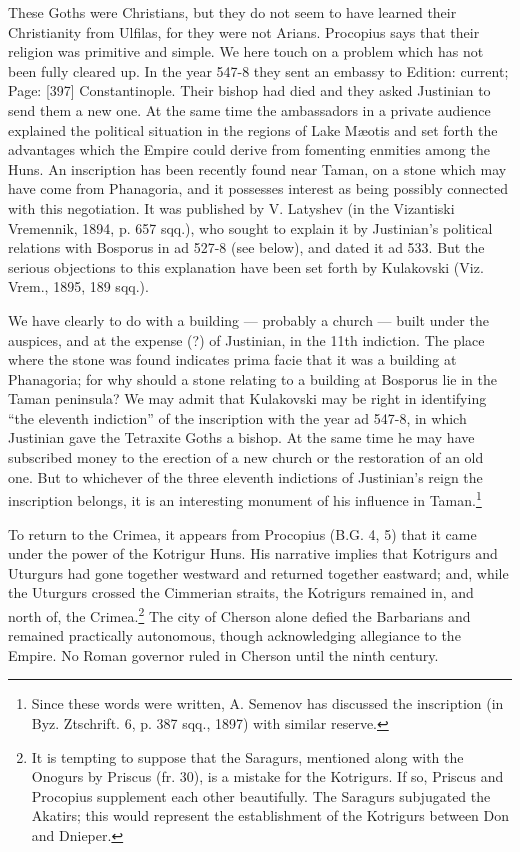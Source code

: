 These Goths were Christians, but they do not seem to have learned their Christianity from Ulfilas, for they were not Arians. Procopius says that their religion was primitive and simple. We here touch on a problem which has not been fully cleared up. In the year 547-8 they sent an embassy to Edition: current; Page: [397] Constantinople. Their bishop had died and they asked Justinian to send them a new one. At the same time the ambassadors in a private audience explained the political situation in the regions of Lake Mæotis and set forth the advantages which the Empire could derive from fomenting enmities among the Huns. An inscription has been recently found near Taman, on a stone which may have come from Phanagoria, and it possesses interest as being possibly connected with this negotiation. It was published by V. Latyshev (in the Vizantiski Vremennik, 1894, p. 657 sqq.), who sought to explain it by Justinian\texthebrew{}’s political relations with Bosporus in ad 527-8 (see below), and dated it ad 533. But the serious objections to this explanation have been set forth by Kulakovski (Viz. Vrem., 1895, 189 sqq.).

We have clearly to do with a building \texthebrew{—} probably a church \texthebrew{—} built under the auspices, and at the expense (?) of Justinian, in the 11th indiction. The place where the stone was found indicates prima facie that it was a building at Phanagoria; for why should a stone relating to a building at Bosporus lie in the Taman peninsula? We may admit that Kulakovski may be right in identifying \texthebrew{“}the eleventh indiction\texthebrew{}” of the inscription with the year ad 547-8, in which Justinian gave the Tetraxite Goths a bishop. At the same time he may have subscribed money to the erection of a new church or the restoration of an old one. But to whichever of the three eleventh indictions of Justinian\texthebrew{}’s reign the inscription belongs, it is an interesting monument of his influence in Taman.\footnote{Since these words were written, A. Semenov has discussed the inscription (in Byz. Ztschrift. 6, p. 387 sqq., 1897) with similar reserve.}

To return to the Crimea, it appears from Procopius (B.G. 4, 5) that it came under the power of the Kotrigur Huns. His narrative implies that Kotrigurs and Uturgurs had gone together westward and returned together eastward; and, while the Uturgurs crossed the Cimmerian straits, the Kotrigurs remained in, and north of, the Crimea.\footnote{It is tempting to suppose that the Saragurs, mentioned along with the Onogurs by Priscus (fr. 30), is a mistake for the Kotrigurs. If so, Priscus and Procopius supplement each other beautifully. The Saragurs subjugated the Akatirs; this would represent the establishment of the Kotrigurs between Don and Dnieper.} The city of Cherson alone defied the Barbarians and remained practically autonomous, though acknowledging allegiance to the Empire. No Roman governor ruled in Cherson until the ninth century.

